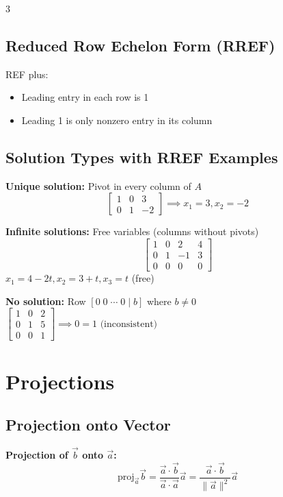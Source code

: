 \documentclass[10pt,landscape]{article}
\begin{document}
\begin{multicols*}{3}
\subsection*{Reduced Row Echelon Form (RREF)}
REF plus:
\begin{itemize}
    \item Leading entry in each row is 1
    \item Leading 1 is only nonzero entry in its column
\end{itemize}

\subsection*{Solution Types with RREF Examples}

\textbf{Unique solution:} Pivot in every column of $A$
$$\left[\begin{array}{cc|c} 1 & 0 & 3 \\ 0 & 1 & -2 \end{array}\right] \implies x_1 = 3, x_2 = -2$$

\textbf{Infinite solutions:} Free variables (columns without pivots)
$$\left[\begin{array}{ccc|c} 1 & 0 & 2 & 4 \\ 0 & 1 & -1 & 3 \\ 0 & 0 & 0 & 0 \end{array}\right]$$
$x_1 = 4 - 2t, x_2 = 3 + t, x_3 = t$ (free)

\textbf{No solution:} Row $[0 \; 0 \; \cdots \; 0 \; | \; b]$ where $b \neq 0$
$\left[\begin{array}{cc|c} 1 & 0 & 2 \\ 0 & 1 & 5 \\ 0 & 0 & 1 \end{array}\right] \implies 0 = 1 \text{ (inconsistent)}$

\newpage

\section*{Projections}

\subsection*{Projection onto Vector}
\textbf{Projection of $\vec{b}$ onto $\vec{a}$:}
$$\text{proj}_{\vec{a}}\vec{b} = \frac{\vec{a} \cdot \vec{b}}{\vec{a} \cdot \vec{a}} \vec{a} = \frac{\vec{a} \cdot \vec{b}}{\|\vec{a}\|^2} \vec{a}$$


\end{multicols*}
\end{document}
